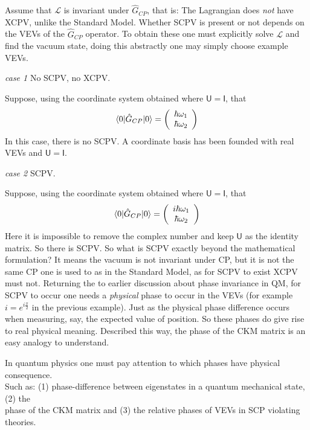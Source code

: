 \documentclass[floatfix,aps,prd,amsmath,amssymb]{revtex4}
\begin{document}
Assume that $\mathcal{L}$ is invariant under $\hat{G}_{CP}$, that is: The Lagrangian does \textit{not} have XCPV, unlike the Standard Model. Whether SCPV is present or not depends on the VEVs of the $\hat{G}_{CP}$ operator. To obtain these one must explicitly solve $\mathcal{L}$ and find the vacuum state, doing this abstractly one may simply choose example VEVs.\\

\begin{flushleft}\textit{case 1} No SCPV, no XCPV. \end{flushleft} 
Suppose, using the coordinate system obtained where $\mathsf{U}=\mathsf{I}$, that
\begin{align*}
\braket{0|\hat{G}_{CP}|0} = \left( \begin{array}{c} \hbar \omega_1 \\ \hbar \omega_2 \end{array}\right)
\end{align*}
In this case, there is no SCPV. A coordinate basis has been founded with real VEVs and $\mathsf{U} = \mathsf{I}$.

\begin{flushleft}\textit{case 2} SCPV. \end{flushleft} 
Suppose, using the coordinate system obtained where $\mathsf{U}=\mathsf{I}$, that
\begin{align*}
\braket{0|\hat{G}_{CP}|0} = \left( \begin{array}{c} i\hbar \omega_1 \\ \hbar \omega_2 \end{array}\right)
\end{align*}
Here it is impossible to remove the complex number and keep $\mathsf{U}$ as the identity matrix. So there is SCPV. So what is SCPV exactly beyond the mathematical formulation? It means the vacuum is not invariant under CP, but it is not the same CP one is used to as in the Standard Model, as for SCPV to exist XCPV must not. Returning the to earlier discussion about phase invariance in QM, for SCPV to occur one  needs a \textit{physical} phase to occur in the VEVs (for example $i=e^{i\frac{\pi}{2}}$ in the previous example). Just as the physical phase difference occurs when measuring, say, the expected value of position. So these phases do give rise to real physical meaning. Described this way, the phase of the CKM matrix is an easy analogy to understand.

\begin{center}
In quantum physics one must pay attention to which phases have physical consequence. \\Such as: (1) phase-difference between eigenstates in a quantum mechanical state, (2) the\\ phase of the CKM matrix and (3) the relative phases of VEVs in SCP violating theories.
\end{center}
\end{document}
